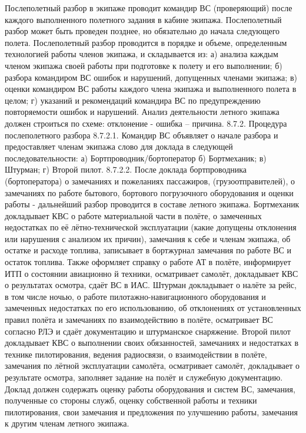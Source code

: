 Послеполетный разбор в экипаже проводит командир ВС (проверяющий) после каждого выполненного полетного задания в кабине экипажа. Послеполетный разбор может быть проведен позднее, но обязательно до начала следующего полета. 
Послеполетный разбор проводится в порядке и объеме, определенным технологией работы членов экипажа, и складывается из: 
а)	анализа каждым членом экипажа своей работы при подготовке к полету и его выполнении;
б)	разбора командиром ВС ошибок и нарушений, допущенных членами экипажа;
в)	оценки командиром ВС работы каждого члена экипажа и выполненного полета в целом;
г)	указаний и рекомендаций командира ВС по предупреждению повторяемости ошибок и нарушений.
Анализ деятельности летного экипажа должен строиться по схеме: отклонение - ошибка – причина.
8.7.2. Процедура послеполетного разбора
8.7.2.1. Командир ВС объявляет о начале разбора и предоставляет членам экипажа слово для доклада в следующей последовательности:
а)	Бортпроводник/бортоператор
б)	Бортмеханик;
в)	Штурман;
г)	Второй пилот.
8.7.2.2. После доклада бортпроводника (бортоператора) о замечаниях и пожеланиях пассажиров, (грузоотправителей), о замечаниях по работе бытового, бортового погрузочного оборудования и оценки работы - дальнейший разбор проводится в составе летного экипажа.
Бортмеханик докладывает КВС о работе материальной части в полёте, о замеченных недостатках по её лётно-технической эксплуатации (какие допущены отклонения или нарушения с анализом их причин), замечания к себе и членам экипажа, об остатке и расходе топлива, записывает в бортжурнал замечания по работе ВС и остаток топлива. Также оформляет справку о работе АТ в полёте, информирует ИТП о состоянии авиационно й техники, осматривает самолёт, докладывает КВС о результатах осмотра, сдаёт ВС в ИАС. Штурман докладывает о налёте за рейс, в том числе ночью, о работе пилотажно-навигационного оборудования и замеченных недостатках по его использованию, об отклонениях от установленных правил полёта и замечаниях по взаимодействию в полёте, осматривает ВС согласно РЛЭ и сдаёт документацию и штурманское снаряжение.
Второй пилот докладывает КВС о выполнении своих обязанностей, замечаниях и недостатках в технике пилотирования, ведения радиосвязи, о взаимодействии в полёте, замечания по лётной эксплуатации самолёта, осматривает самолёт, докладывает о результате осмотра, заполняет задание на полёт и служебную документацию.
Доклад должен содержать оценку работы оборудования и систем ВС, замечания, полученные со стороны служб, оценку собственной работы и техники пилотирования, свои замечания и предложения по улучшению работы, замечания к другим членам летного экипажа.
